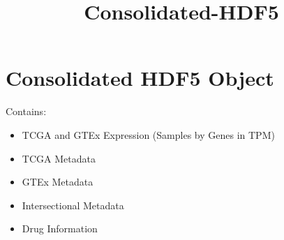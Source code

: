 \documentclass[11pt]{article}
\title{Consolidated-HDF5}
\providecommand{\tightlist}{%
      \setlength{\itemsep}{0pt}\setlength{\parskip}{0pt}}
\begin{document}
    
    
    \maketitle
    
    

    
    \section{Consolidated HDF5 Object}\label{consolidated-hdf5-object}

Contains:

\begin{itemize}
\tightlist
\item
  TCGA and GTEx Expression (Samples by Genes in TPM)
\item
  TCGA Metadata
\item
  GTEx Metadata
\item
  Intersectional Metadata
\item
  Drug Information
\end{itemize}
\end{document}
